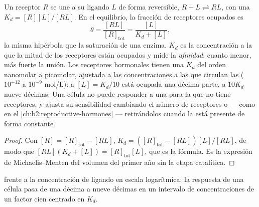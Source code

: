 \begin{theorem}\label{thm:b2:cell-signalling:occupancy}
Un receptor $R$ se une a su ligando $L$ de forma reversible, $R + L
\rightleftharpoons RL$, con una \emph{} $K_d =
[R][L]/[RL]$. En el equilibrio, la fracción de receptores ocupados es
\[
\theta = \frac{[RL]}{[R]_{\text{tot}}} = \frac{[L]}{K_d + [L]},
\]
la misma hipérbola que la saturación de una enzima. $K_d$ es la
concentración a la que la mitad de los receptores están ocupados y mide
la \emph{afinidad}: cuanto menor, más fuerte la unión. Los receptores
hormonales tienen una $K_d$ del orden nanomolar a picomolar, ajustada a
las concentraciones a las que circulan las  ($10^{-12}$ a
$10^{-9}$ mol/L): a $[L] = K_d/10$ está ocupada una décima parte, a
$10K_d$ nueve décimas. Una célula no puede responder a una  para la
que no tiene receptores, y ajusta su sensibilidad cambiando el número de
receptores o --- como en el \cref{ch:b2:reproductive-hormones} ---
retirándolos cuando la  está presente de forma constante.
\end{theorem}
\begin{proof}
Con $[R] = [R]_{\text{tot}} - [RL]$, $K_d = ([R]_{\text{tot}} -
[RL])[L]/[RL]$, de modo que $[RL](K_d + [L]) = [R]_{\text{tot}}[L]$, que es
la fórmula. Es la expresión de Michaelis--Menten del volumen del primer
año sin la etapa catalítica.
\end{proof}

\begin{omfigure}

{\small {} frente a la concentración de ligando
en escala logarítmica: la respuesta de una célula pasa de una décima a
nueve décimas en un intervalo de concentraciones de un factor cien
centrado en $K_d$.}
\end{omfigure}

